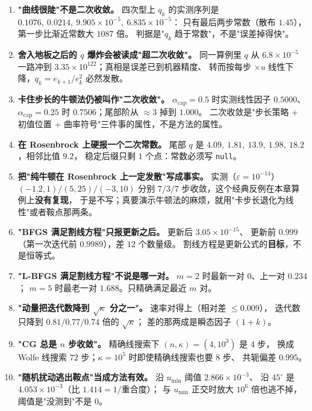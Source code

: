 \begin{enumerate}
  \item \textbf{"曲线很陡"不是二次收敛。} 四次型上 $q_k$ 的实测序列是
        $0.1076,\ 0.0214,\ 9.905\times10^{-5},\ 6.835\times10^{-5}$：
        只有最后两步常数（散布 $1.45$），第一步比渐近常数大 $1087$ 倍。
        判据是"$q_k$ 趋于常数"，不是"误差掉得快"。
  \item \textbf{舍入地板之后的 $q$ 爆炸会被读成"超二次收敛"。} 同一算例里 $q$ 从
        $6.8\times10^{-5}$ 一路冲到 $3.35\times10^{122}$；真相是误差已到机器精度、
        转而按每步 $\times u$ 线性下降，$q_k=e_{k+1}/e_k^2$ 必然发散。
  \item \textbf{卡住步长的牛顿法仍被叫作"二次收敛"。} $\alpha_{\text{cap}}=0.5$ 时实测线性因子
        $0.5000$、$\alpha_{\text{cap}}=0.25$ 时 $0.7506$；尾部阶从 $\approx3$ 掉到 $1.000$。
        二次收敛是"步长策略 $+$ 初值位置 $+$ 曲率符号"三件事的属性，不是方法的属性。
  \item \textbf{在 Rosenbrock 上硬报一个二次常数。} 尾部 $q$ 是
        $4.09,\ 1.81,\ 13.9,\ 1.98,\ 18.2$，相邻比值 $9.2$，
        稳定后缀只剩 $1$ 个点：常数必须写 \texttt{null}。
  \item \textbf{把"纯牛顿在 Rosenbrock 上一定发散"写成事实。} 实测（$\varepsilon=10^{-14}$）
        $(-1.2,1)/(5,25)/(-3,10)$ 分别 $7/3/7$ 步收敛，这个经典反例在本章算例上\textbf{没有复现}，
        于是不写；真要演示牛顿法的麻烦，就用"卡步长退化为线性"或者鞍点那两条。
  \item \textbf{"BFGS 满足割线方程"只报更新之后。} 更新后 $3.05\times10^{-15}$、
        更新前 $0.999$（第一次迭代前 $0.9989$），差 $12$ 个数量级。
        割线方程是更新公式的\textbf{目标}，不是恒等式。
  \item \textbf{"L-BFGS 满足割线方程"不说是哪一对。} $m=2$ 时最新一对 $0$、上一对 $0.234$；
        $m=5$ 时最老一对 $1.688$。只精确满足最近 $m$ 对。
  \item \textbf{"动量把迭代数降到 $\sqrt\kappa$ 分之一"。} 速率对得上（相对差 $\le0.009$），
        迭代数只降到 $0.81/0.77/0.74$ 倍的 $\sqrt\kappa$；
        差的那两成是瞬态因子 $(1+k)$。
  \item \textbf{"CG 总是 $n$ 步收敛"。} 精确线搜索下 $(n,\kappa)=(4,10^3)$ 是 $4$ 步，
        换成 Wolfe 线搜索 $72$ 步；$\kappa=10^5$ 时即使精确线搜索也要 $8$ 步、
        共轭偏差 $0.995$。
  \item \textbf{"随机扰动逃出鞍点"当成方法有效。} 沿 $u_{\min}$ 阈值 $2.866\times10^{-3}$、
        沿 $45^\circ$ 是 $4.053\times10^{-3}$（比 $1.414=1/\text{重合度}$）；
        与 $u_{\min}$ 正交时放大 $10^{6}$ 倍也逃不掉，阈值是"没测到"不是 $0$。

\end{enumerate}
